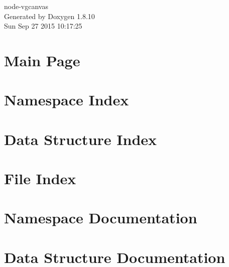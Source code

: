 \documentclass[twoside]{book}
\newcommand{\+}{\discretionary{\mbox{\scriptsize$\hookleftarrow$}}{}{}}
\newcommand{\clearemptydoublepage}{%
  \newpage{\pagestyle{empty}\cleardoublepage}%
}
\begin{document}
\hypersetup{pageanchor=false,
             bookmarks=true,
             bookmarksnumbered=true,
             pdfencoding=unicode
            }
\begin{titlepage}
\vspace*{7cm}
\begin{center}%
{\Large node-\/vgcanvas }\\
\vspace*{1cm}
{\large Generated by Doxygen 1.8.10}\\
\vspace*{0.5cm}
{\small Sun Sep 27 2015 10:17:25}\\
\end{center}
\end{titlepage}
\clearemptydoublepage
\tableofcontents
\clearemptydoublepage
{}
\hypersetup{pageanchor=true}

\chapter{Main Page}
\label{index}\hypertarget{index}{}
\chapter{Namespace Index}

\chapter{Data Structure Index}

\chapter{File Index}

\chapter{Namespace Documentation}

\chapter{Data Structure Documentation}




\end{document}
